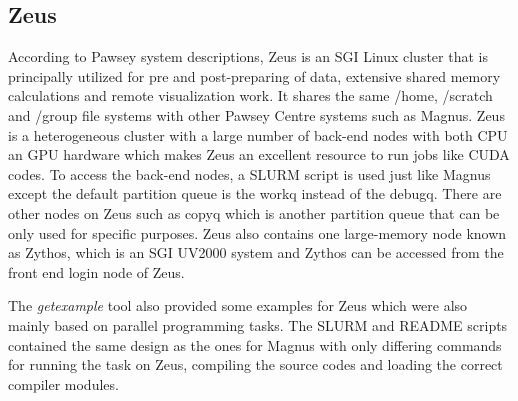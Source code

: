 \subsection{Zeus}

According to Pawsey system descriptions, Zeus is an SGI Linux cluster that is principally utilized for pre and post-preparing of data, extensive shared 
memory calculations and remote visualization work. It shares the same /home, /scratch and /group file systems with other Pawsey Centre systems such as 
Magnus. Zeus is a heterogeneous cluster with a large number of back-end nodes with both CPU an GPU hardware which makes Zeus an excellent resource to run
jobs like CUDA codes. To access the back-end nodes, a SLURM script is used just like Magnus except the default partition queue is the workq instead of 
the debugq. There are other nodes on Zeus such as copyq which is another partition queue that can be only used for specific purposes. Zeus also contains 
one large-memory node known as Zythos, which is an SGI UV2000 system and Zythos can be accessed from the front end login node of Zeus. 

The \emph{getexample} tool also provided some examples for Zeus which were also mainly based on parallel programming tasks. The SLURM and README scripts
contained the same design as the ones for Magnus with only differing commands for running the task on Zeus, compiling the source codes and loading the
correct compiler modules. 
 
